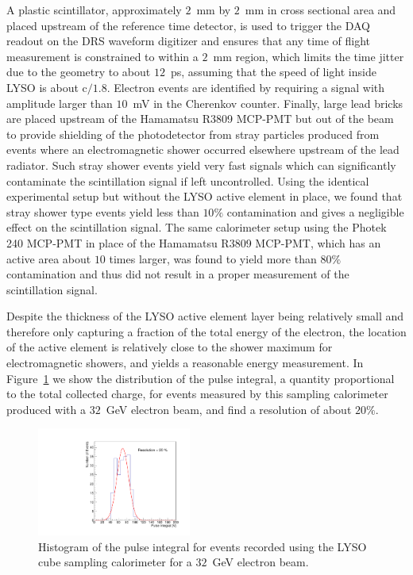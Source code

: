 \documentclass[12pt]{article}
\begin{document}
A plastic scintillator, approximately $2$~mm by $2$~mm in cross sectional area
and placed upstream of the reference time detector, is used to trigger
the DAQ readout on the DRS waveform digitizer and ensures that any
time of flight measurement is constrained to within a $2$~mm region,
which limits the time jitter due to the geometry to about $12$~ps, 
assuming that the speed of light inside LYSO is about $\mathrm{c}/1.8$.
Electron events are identified by requiring a signal with amplitude
larger than $10$~mV in the Cherenkov counter.
Finally, large lead bricks are placed upstream of the Hamamatsu
R3809 MCP-PMT but out of the beam to provide shielding of the photodetector
from stray particles produced from events where an electromagnetic shower
occurred elsewhere upstream of the lead radiator. Such stray shower
events yield very fast signals which can significantly contaminate the
scintillation signal if left uncontrolled. Using the identical
experimental setup but without the LYSO active element in place,
we found that stray shower type events yield less than $10\%$ contamination
and gives a negligible effect on the scintillation signal. The same calorimeter
setup using the Photek 240 MCP-PMT in place of the Hamamatsu R3809 MCP-PMT,
which has an active area about $10$ times larger, was found to yield 
more than $80\%$ contamination and thus did not result in a proper
measurement of the scintillation signal.

Despite the thickness of the LYSO active element layer being relatively
small and therefore only capturing a fraction of the total energy
of the electron, the location of the active element is relatively close to the
shower maximum for electromagnetic showers, and yields
a reasonable energy measurement. In Figure~\ref{fig:LYSOCubeEnergy32GeV}
we show the distribution of the pulse integral, a quantity
proportional to the total collected charge, for events
measured by this sampling calorimeter produced with a
$32$~GeV electron beam, and find a resolution of about $20\%$.


\begin{figure}[h] \centering
\includegraphics[width=0.45\textwidth]{figs/TOF_Electron_LYSOCube_32GeV_energy} 
\caption{ Histogram of the pulse integral for events recorded using
the LYSO cube sampling calorimeter for a $32$~GeV electron beam. } 
\label{fig:LYSOCubeEnergy32GeV}
\end{figure}
\end{document}
